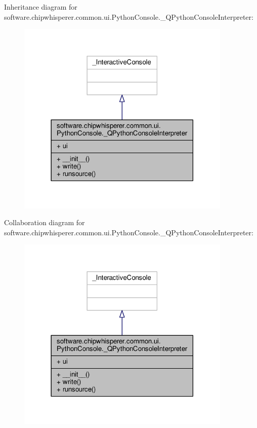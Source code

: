 Inheritance diagram for software.\+chipwhisperer.\+common.\+ui.\+Python\+Console.\+\_\+\+Q\+Python\+Console\+Interpreter\+:\nopagebreak
\begin{figure}[H]
\begin{center}
\leavevmode
\includegraphics[width=290pt]{da/d69/classsoftware_1_1chipwhisperer_1_1common_1_1ui_1_1PythonConsole_1_1__QPythonConsoleInterpreter__inherit__graph}
\end{center}
\end{figure}


Collaboration diagram for software.\+chipwhisperer.\+common.\+ui.\+Python\+Console.\+\_\+\+Q\+Python\+Console\+Interpreter\+:\nopagebreak
\begin{figure}[H]
\begin{center}
\leavevmode
\includegraphics[width=290pt]{de/d95/classsoftware_1_1chipwhisperer_1_1common_1_1ui_1_1PythonConsole_1_1__QPythonConsoleInterpreter__coll__graph}
\end{center}
\end{figure}


